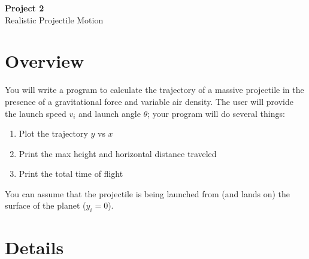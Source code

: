 \documentclass{article}
\begin{document}
\fancyfoot[C]{\thepage}
\vspace*{0cm}
\begin{center}
	{\LARGE \textbf{Project 2}}\\
	\vspace{.25cm}
	{\Large Realistic Projectile Motion}
\end{center}

\section*{Overview}
You will write a program to calculate the trajectory of a massive projectile in the presence of a gravitational force and variable air density. The user will provide the launch speed $v_i$ and launch angle $\theta$; your program will do several things:
\begin{enumerate}
	\item Plot the trajectory $y$ vs $x$
	\item Print the max height and horizontal distance traveled
	\item Print the total time of flight
\end{enumerate}
You can assume that the projectile is being launched from (and lands on) the surface of the planet ($y_i=0$).

\section*{Details}
\end{document}
